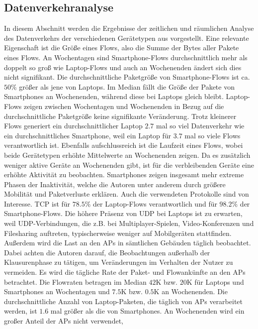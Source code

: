 \documentclass[12pt, a4paper]{article}
\begin{document}
\subsection{Datenverkehranalyse}
\label{sec:phase2_b}

In diesem Abschnitt werden die Ergebnisse der zeitlichen und räumlichen Analyse des Datenverkehrs der verschiedenen Gerätetypen
aus \cite{Alipour2018} vorgestellt. Eine relevante Eigenschaft ist die Größe eines Flows, also die Summe der Bytes aller
Pakete eines Flows. An Wochentagen sind Smartphone-Flows durchschnittlich mehr als doppelt so groß wie Laptop-Flows
und auch an Wochenenden ändert sich dies nicht signifikant. Die durchschnittliche Paketgröße von Smartphone-Flows
ist ca. $50 \%$ größer als jene von Laptops. Im Median fällt die Größe der Pakete von Smartphones an Wochenenden, 
während diese bei Laptops gleich bleibt. Laptop-Flows zeigen zwischen Wochentagen und Wochenenden in Bezug auf die 
durchschnittliche Paketgröße keine signifikante Veränderung. Trotz kleinerer Flows generiert ein durchschnittlicher Laptop $2.7$
mal so viel Datenverkehr wie ein durchschnittliches Smartphone, weil ein Laptop für $3.7$ mal so viele Flows verantwortlich ist.
Ebenfalls aufschlussreich ist die Laufzeit eines Flows, wobei beide Gerätetypen erhöhte Mittelwerte an Wochenenden zeigen.
Da es zusätzlich weniger aktive Geräte an Wochenenden gibt, ist für die verbleibenden Geräte eine erhöhte Aktivität
zu beobachten. Smartphones zeigen insgesamt mehr extreme Phasen der Inaktivität, welche die Autoren unter anderem durch größere
Mobilität und Paketverluste erklären. Auch die verwendeten Protokolle sind von Interesse. 
TCP ist für $78.5 \%$ der Laptop-Flows verantwortlich und für $98.2 \%$ der Smartphone-Flows. 
Die höhere Präsenz von UDP bei Laptops ist zu erwarten, weil UDP-Verbindungen, die z.B. bei Multiplayer-Spielen, 
Video-Konferenzen und Filesharing auftreten, typischerweise weniger auf Mobilgeräten stattfinden. \cite{Alipour2018}
Außerdem wird die Last an den APs in sämtlichen Gebäuden täglich beobachtet. Dabei achten die Autoren darauf,
die Beobachtungen außerhalb der Klausurenphase zu tätigen, um Veränderungen im Verhalten der Nutzer zu vermeiden.
Es wird die tägliche Rate der Paket- und Flowankünfte an den APs betrachtet. Die Flowraten betragen im Median
$42$\textsc{K} bzw. $20$\textsc{K} für Laptops und Smartphones an Wochentagen und $7.5$\textsc{K} bzw. $0.5$\textsc{K}
an Wochenenden. Die durchschnittliche Anzahl von Laptop-Paketen, die täglich von APs verarbeitet werden,
ist $1.6$ mal größer als die von Smartphones. An Wochenenden wird ein großer Anteil der APs nicht verwendet,
\end{document}
